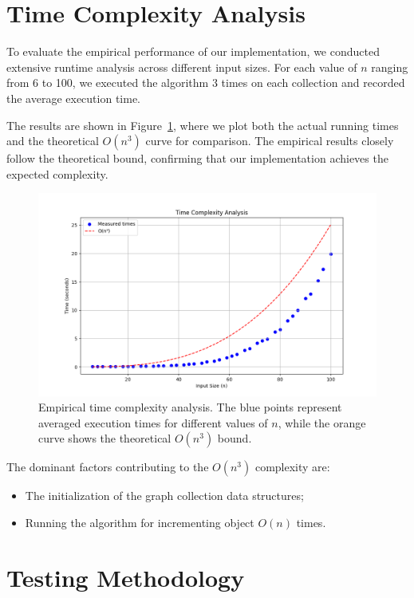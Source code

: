 \section{Time Complexity Analysis}

To evaluate the empirical performance of our implementation, we conducted extensive runtime analysis 
across different input sizes. For each value of $n$ ranging from 6 to 100, we executed the algorithm
3 times on each collection and recorded the average execution time.

The results are shown in Figure~\ref{fig:time_complexity}, where we plot both the actual running times 
and the theoretical $O(n^3)$ curve for comparison. The empirical results closely follow the theoretical 
bound, confirming that our implementation achieves the expected complexity.

\begin{figure}[H]
    \centering
    \includegraphics[width=1\textwidth]{figuras/time_complexity.png}
    \caption{Empirical time complexity analysis. The blue points represent averaged execution times 
    for different values of $n$, while the orange curve shows the theoretical $O(n^3)$ bound.}
    \label{fig:time_complexity}
\end{figure}

The dominant factors contributing to the $O(n^3)$ complexity are:

\begin{itemize}
    \item The initialization of the graph collection data structures;
    \item Running the algorithm for incrementing object $O(n)$ times.
\end{itemize}

\section{Testing Methodology}

